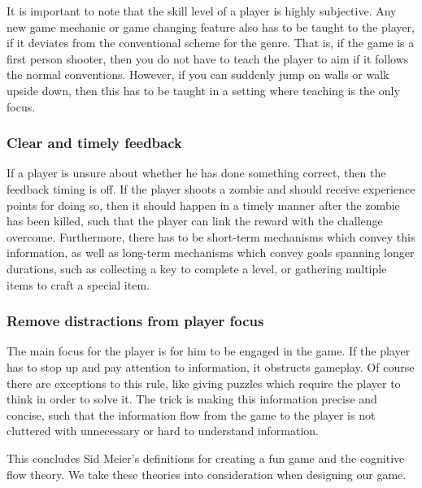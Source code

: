 It is important to note that the skill level of a player is highly subjective.
Any new game mechanic or game changing feature also has to be taught to the player, if it deviates from the conventional scheme for the genre.
That is, if the game is a first person shooter, then you do not have to teach
the player to aim if it follows the normal conventions. However, if you can suddenly
jump on walls or walk upside down, then this has to be taught in a setting
where teaching is the only focus.

\subsubsection{Clear and timely feedback}
If a player is unsure about whether he has done something correct, then the feedback timing is off.
If the player shoots a zombie and should receive experience points for doing so, then it should happen in a timely manner after the zombie has been killed, such that the player can link the reward with the challenge overcome.
Furthermore, there has to be short-term mechanisms which convey this information, as well as long-term mechanisms which convey goals spanning longer durations,
such as collecting a key to complete a level, or gathering multiple items to craft a special item.

\subsubsection{Remove distractions from player focus}\label{introductions:makingthegamefun:removedistractionsfromplayerfocus}
The main focus for the player is for him to be engaged in the game.
If the player has to stop up and pay attention to information, it obstructs gameplay.
Of course there are exceptions to this rule, like giving puzzles which require the player to think in order to solve it.
The trick is making this information precise and concise, such that the
information flow from the game to the player is not cluttered with unnecessary or hard to understand information.

This concludes Sid Meier's definitions for creating a fun game and the
cognitive flow theory.
We take these theories into consideration when designing our game.

